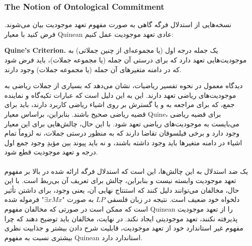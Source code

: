 \documentclass[10pt,a4paper]{article}
\begin{document}
                    \subsubsection{The Notion of Ontological Commitment}
نسخه‌هایی از استدلال فرگه گاهی به صورت مفهوم تعهد موجودیت بیان می‌شوند. فرض کنید با معیار Quinean عادی تعهد موجودیت عمل کنیم:
                        \begin{qt}
                            \textbf{Quine’s Criterion.}
یک جمله درجه اول (یا مجموعه‌ای از چنین جملاتی) به موجودیت‌هایی تعهد دارد که برای درستی آن جمله (یا مجموعه جملات)، باید فرض شود که در دامنه متغیرهای آن جمله (یا مجموعه جملات) وجود دارند.
                        \end{qt}
دیدگاه معمول در نحوه تفسیر ریاضیات، نشان می‌دهد که بسیاری از جملات ریاضی به موجودیت‌های ریاضی تعهد دارند. این به این دلیل است که عبارات تکیه‌گاه و نماینده جمع، که برای مراجعه به و یا گسترش بر روی اشیاء ریاضی کاربرد دارند، باید برای قضیه ریاضی صحیح باشند. بنابراین، براساس معیار Quine، برای قضیه ریاضی می‌بایست به موجودیت‌های ریاضی تعهد شود. با این حال، چالش‌هایی برای این معیار وجود دارد و برخی فیلسوفان تقاضا دارند که به منظور درستی جملات، نه لزوماً تمام اشیاء در دامنه متغیرها باید وجود داشته باشند، و نه باید پیوند بین مؤیدِ وجود جمع اول درجه و تعهد موجودیت قطع شود.
                        \\
                        \\
یک ضد استدلال به این چالش‌ها، این است که استدلال فرگه ارائه شده در بالا بر مفهوم تعهد موجودیت وابسته نیست و بنابراین، چالش برای تعریف آن بی‌ربط است. با این حال، مخالفان می‌توانند دلیل کنند که استنتاج نهایی آن، یعنی وجود، برای داشتن تأثیر دلخواه خود ضعیف است. نتیجه در زبان فلسفی $LP$ به صورت "$\exists xMx$" فرموله شده است که ممکن است در صورتی که مخالفان مفهوم Quinean را از تعهد موجودیت پذیرفته نکنند، تعهد موجودیتی ایجاد نکند. در نهایت، مخالفان باید توضیح دهند که چرا مفهوم غیر استاندارد خود از تعهد موجودیت، قابلیت شرح دادن بیشتر و جذابیت نظری بیشتری نسبت به مفهوم Quinean استاندارد دارد.
\end{document}
